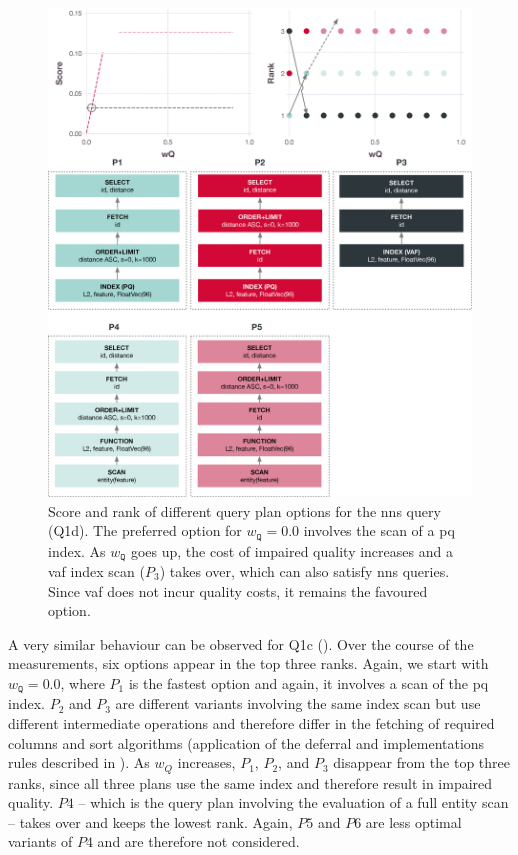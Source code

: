 \begin{figure}[p]
    \centering
    \includegraphics[width=\textwidth]{figures/analytics/analytics-cottontail-cost-nns-annotated}
    \caption{Score and rank of different query plan options for the \acrshort{nns} query (Q1d). The preferred option for $w_{\texttt{Q}} = 0.0$ involves the scan of a \acrshort{pq} index. As $w_{\texttt{Q}}$ goes up, the cost of impaired quality increases and a \acrshort{vaf} index scan ($P_3$) takes over, which can also satisfy \acrshort{nns} queries. Since \acrshort{vaf} does not incur quality costs, it remains the favoured option.}
    \label{figure:cottontail_analytics_cost_nns}
\end{figure}

A very similar behaviour can be observed for Q1c (). Over the course of the measurements, six options appear in the top three ranks. Again, we start with  $w_{\mathtt{Q}} = 0.0$, where $P_1$ is the fastest option and again, it involves a scan of the \acrshort{pq} index. $P_2$ and $P_3$ are different variants involving the same index scan but use different intermediate operations and therefore differ in the fetching of required columns and sort algorithms (application of the deferral and implementations rules described in ). As $w_Q$ increases, $P_1$, $P_2$, and $P_3$ disappear from the top three ranks, since all three plans use the same index and therefore result in impaired quality. $P4$ -- which is the query plan involving the evaluation of a full entity scan -- takes over and keeps the lowest rank. Again, $P5$ and $P6$ are less optimal variants of $P4$ and are therefore not considered.

